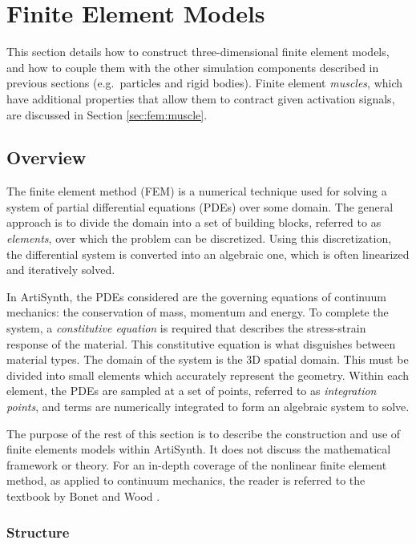 \section{Finite Element Models}
\label{FEMModels:sec}

This section details how to construct three-dimensional finite element models,
and how to couple them with the other simulation components described in
previous sections (e.g.~particles and rigid bodies).  Finite element
\emph{muscles}, which have additional properties that allow them to contract
given activation signals, are discussed in Section \ref{sec:fem:muscle}.

\subsection{Overview}
\label{sec:fem:overview}

The finite element method (FEM) is a numerical technique used for solving a 
system of partial differential equations (PDEs) over some domain.  The general
approach is to divide the domain into a set of building blocks, referred to
as \emph{elements}, over which the problem can be discretized.  Using this
discretization, the differential system is converted into an algebraic one,
which is often linearized and iteratively solved.

In ArtiSynth, the PDEs considered are the governing equations of
continuum mechanics: the conservation of mass, momentum and energy.  To 
complete the system, a \emph{constitutive equation} is required that describes
the stress-strain response of the material.  This constitutive equation is what
disguishes between material types.  The domain of the system is the 3D spatial 
domain.  This must be divided into small elements which accurately represent
the geometry. Within each element, the PDEs are
sampled at a set of points, referred to as \emph{integration points}, and 
terms are numerically integrated to form an algebraic system to solve.

The purpose of the rest of this section is to describe the construction and
use of finite elements models within ArtiSynth.  It does not discuss the
mathematical framework or theory.
For an in-depth coverage of the nonlinear finite element method, as applied
to continuum mechanics, the reader is referred to the textbook by Bonet and 
Wood \cite{bonet:fem:2000}.

\subsubsection{Structure}
\label{sec:fem:structure}

